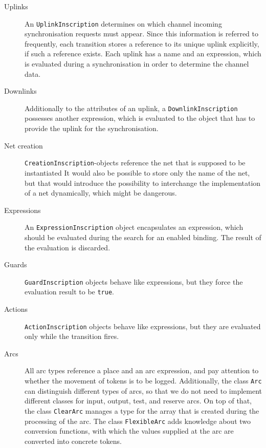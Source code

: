 \begin{description}
\item[Uplinks] An \texttt{UplinkInscription} determines on which
channel incoming synchronisation requests must appear. Since
this information is referred to frequently, 
each transition stores a reference to
its unique uplink explicitly, if such a reference exists. 
Each uplink has a name and an
expression, which is evaluated during a synchronisation in order to
determine the channel data.

\item[Downlinks] Additionally to the attributes
of an uplink, a \texttt{DownlinkInscription} 
possesses another expression, which is evaluated to the object that
has to provide the uplink for the synchronisation.

\item[Net creation] \texttt{CreationInscription}-objects 
reference the net that is supposed to be instantiated
It would also be possible to store only the
name of the net, but that would introduce the possibility
to interchange the implementation of a net dynamically, 
which might be dangerous.

\item[Expressions] An \texttt{ExpressionInscription}
object encapsulates an expression,
which should be evaluated during the search for an enabled
binding. The result of the evaluation is discarded.

\item[Guards] \texttt{GuardInscription} 
objects behave like expressions, but they force
the evaluation result to be \texttt{true}.

\item[Actions] \texttt{ActionInscription} 
objects behave like expressions, but they are
evaluated only while the transition fires.

\item[Arcs] All arc types reference a place and an
arc expression, and pay attention to whether the movement of tokens is to
be logged. Additionally, the class \texttt{Arc} 
can distinguish different types of
arcs, so that we do not need to implement different
classes for input, output, test, and reserve arcs.
On top of that, the class \texttt{ClearArc} manages a type
for the array that is created during the processing of the arc. The
class \texttt{FlexibleArc} adds knowledge about
two conversion functions, with which
the values supplied at the arc are converted into concrete tokens.
\end{description}


